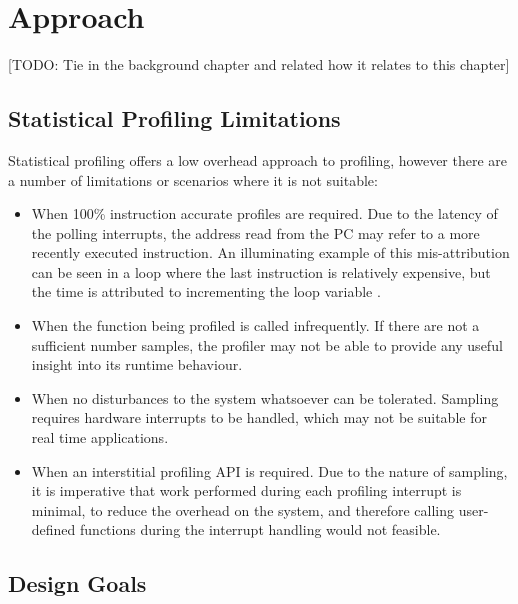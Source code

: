 \chapter{Approach}\label{ch:approach}

[TODO: Tie in the background chapter and related how it relates to this chapter]

\section{Statistical Profiling Limitations}

Statistical profiling offers a low overhead approach to profiling, however there are a number of limitations or scenarios where it is not suitable:

\begin{itemize}
    \item When 100\% instruction accurate profiles are required. Due to the latency of the polling interrupts, the address read from the PC may refer to a more recently executed instruction. An illuminating example of this mis-attribution can be seen in a loop where the last instruction is relatively expensive, but the time is attributed to incrementing the loop variable \cite{DocsOProfileInter}.
    \item When the function being profiled is called infrequently. If there are not a sufficient number samples, the profiler may not be able to provide any useful insight into its runtime behaviour.
    \item When no disturbances to the system whatsoever can be tolerated. Sampling requires hardware interrupts to be handled, which may not be suitable for real time applications.
    \item When an interstitial profiling API is required. Due to the nature of sampling, it is imperative that work performed during each profiling interrupt is minimal, to reduce the overhead on the system, and therefore calling user-defined functions during the interrupt handling would not feasible.
\end{itemize}

\section{Design Goals}


